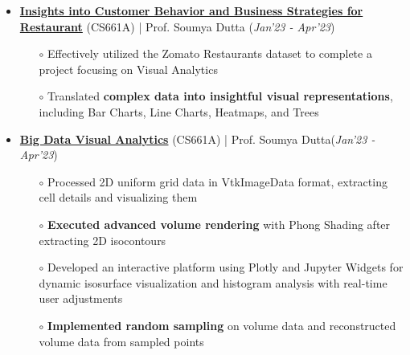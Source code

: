\documentclass[10.8pt, a4paper]{extarticle}
\begin{document}
\begin{itemize}
  \item \href{https://github.com/Vinay-Agrawal29/CS661_bizviz} {\textbf{Insights into Customer Behavior and Business Strategies for Restaurant}} (CS661A) | Prof. Soumya Dutta  \hfill\hfill(\textit{Jan'23 - Apr'23})
  \begin{itemize}
    \item[$\circ$] Effectively utilized the Zomato Restaurants dataset to complete a project focusing on Visual Analytics\\[-0.6cm]
    \item[$\circ$] Translated \textbf{complex data into insightful visual representations}, including Bar Charts, Line Charts, Heatmaps, and Trees \\[-0.6cm]
  \end{itemize}
  \vspace{0.055cm}
  \item \href{https://github.com/vamshimorlawar/CS661} {\textbf{Big Data Visual Analytics}} (CS661A) | Prof. Soumya Dutta\hfill\hfill(\textit{Jan'23 - Apr'23})
	\begin{itemize}
	    \item[$\circ$] Processed 2D uniform grid data in VtkImageData format, extracting cell details and visualizing them \\[-0.6cm]
	    \item[$\circ$] \textbf{Executed advanced volume rendering} with Phong Shading after extracting 2D isocontours \\[-0.6cm]
	    \item[$\circ$] Developed an interactive platform using Plotly and Jupyter Widgets for dynamic isosurface visualization and histogram analysis with real-time user adjustments\\[-0.6cm]
	    \item[$\circ$]\textbf{Implemented random sampling} on volume data and reconstructed volume data from sampled points \\[-0.6cm]
	\end{itemize}
  \vspace{0.055cm}

\end{itemize}
\end{document}
